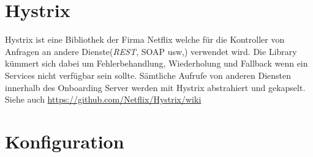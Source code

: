 \section{Hystrix}
\label{hystrix}

Hystrix ist eine Bibliothek der Firma Netflix welche für die Kontroller von Anfragen an andere Dienste(\textit{\gls{REST}}, SOAP usw,) verwendet wird. Die Library kümmert sich dabei um Fehlerbehandlung, Wiederholung und Fallback wenn ein Services nicht verfügbar sein sollte. Sämtliche Aufrufe von anderen Diensten innerhalb des Onboarding Server werden mit Hystrix abstrahiert und gekapselt. Siehe auch \url{https://github.com/Netflix/Hystrix/wiki}

\section{Konfiguration}
\label{config}

